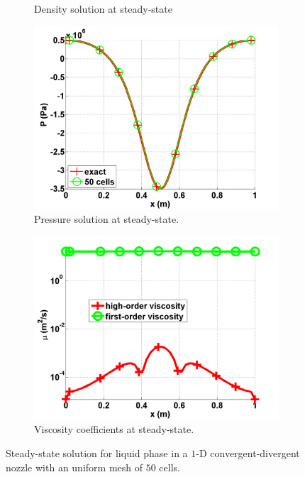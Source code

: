 \begin{figure}[H]
\begin{subfigure}[b]{0.495\textwidth}
                \caption{Density solution at steady-state}
                \label{fig:1d_nozzle_liq_density}
        \end{subfigure}
        \begin{subfigure}[b]{0.495\textwidth}
                \centering
                \includegraphics[scale=.50]{figures/liquid_pressure_numerical_and_exact_50.png}
                \caption{Pressure solution at steady-state.}
                \label{fig:1d_nozzle_liq_press}
        \end{subfigure}
        \begin{subfigure}[b]{0.495\textwidth}
                \centering
                \includegraphics[scale=.50]{figures/liquid_viscosity_numerical50.png}
                \caption{Viscosity coefficients at steady-state.}
                \label{fig:1d_nozzle_liq_visc}
        \end{subfigure}
        \caption{Steady-state solution for liquid phase in a $1$-D convergent-divergent nozzle with an uniform mesh of $50$ cells.}\label{fig:1d_liq_nozzle}
\end{figure}
